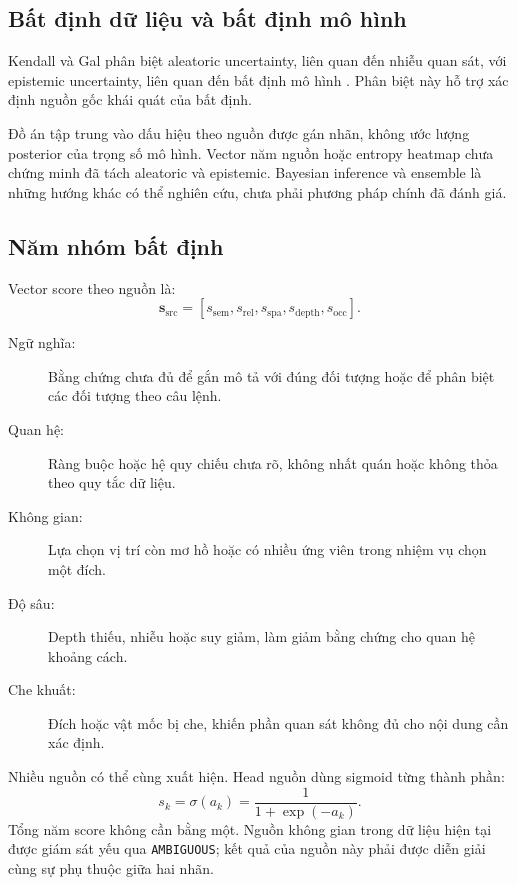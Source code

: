 \subsection{Bất định dữ liệu và bất định mô hình}

Kendall và Gal phân biệt aleatoric uncertainty, liên quan đến nhiễu quan sát, với epistemic uncertainty, liên quan đến bất định mô hình \cite{kendall2017uncertainties}. Phân biệt này hỗ trợ xác định nguồn gốc khái quát của bất định.

Đồ án tập trung vào dấu hiệu theo nguồn được gán nhãn, không ước lượng posterior của trọng số mô hình. Vector năm nguồn hoặc entropy heatmap chưa chứng minh đã tách aleatoric và epistemic. Bayesian inference và ensemble là những hướng khác có thể nghiên cứu, chưa phải phương pháp chính đã đánh giá.

\subsection{Năm nhóm bất định}

Vector score theo nguồn là:
\begin{equation}
    \mathbf{s}_{\mathrm{src}}=
    [s_{\mathrm{sem}},s_{\mathrm{rel}},s_{\mathrm{spa}},
     s_{\mathrm{depth}},s_{\mathrm{occ}}].
    \label{eq:theory-source-vector}
\end{equation}
\begin{description}
    \item[Ngữ nghĩa:] Bằng chứng chưa đủ để gắn mô tả với đúng đối tượng hoặc để phân biệt các đối tượng theo câu lệnh.
    \item[Quan hệ:] Ràng buộc hoặc hệ quy chiếu chưa rõ, không nhất quán hoặc không thỏa theo quy tắc dữ liệu.
    \item[Không gian:] Lựa chọn vị trí còn mơ hồ hoặc có nhiều ứng viên trong nhiệm vụ chọn một đích.
    \item[Độ sâu:] Depth thiếu, nhiễu hoặc suy giảm, làm giảm bằng chứng cho quan hệ khoảng cách.
    \item[Che khuất:] Đích hoặc vật mốc bị che, khiến phần quan sát không đủ cho nội dung cần xác định.
\end{description}

Nhiều nguồn có thể cùng xuất hiện. Head nguồn dùng sigmoid từng thành phần:
\begin{equation}
    s_k=\sigma(a_k)=\frac{1}{1+\exp(-a_k)}.
    \label{eq:theory-source-sigmoid}
\end{equation}
Tổng năm score không cần bằng một. Nguồn không gian trong dữ liệu hiện tại được giám sát yếu qua \texttt{AMBIGUOUS}; kết quả của nguồn này phải được diễn giải cùng sự phụ thuộc giữa hai nhãn.


